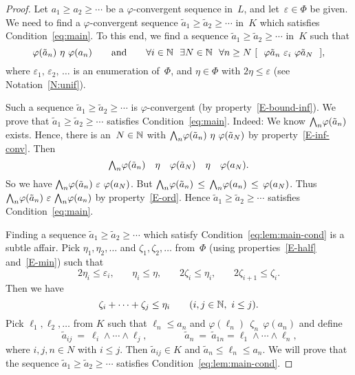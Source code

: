 \documentclass[main.tex]{subfiles}
\begin{document}
\begin{proof}
Let $a_1 \geq a_2 \geq \dotsb$ 
be a $\varphi$-convergent sequence in~$L$,
and let~$\varepsilon\in\Phi$ be given.
We need to find a $\varphi$-convergent sequence 
$\tilde a_1 \geq \tilde a_2 \geq \dotsb$ in~$K$
which satisfies Condition~\eqref{eq:main}.
To this end,
we find a sequence 
$\tilde a_1 \geq \tilde a_2 \geq \dotsb$ in~$K$
such that
\begin{equation}
\label{eq:lem:main-cond}
\varphi(\tilde a_n) \ \eta\ \varphi (a_n)
\qquad\text{and}\qquad
\forall i\in\N\ \ \exists N\in\N 
\ \ \forall n\geq N
\  [\ \  \varphi \tilde a_n \ \varepsilon_i\  \varphi \tilde a_N \ \ ],
\end{equation}
where $\varepsilon_1,\,\varepsilon_2,\,\dotsc$
is
an enumeration of~$\Phi$,
and $\eta\in\Phi$ with  $2\eta \leq \varepsilon$
(see Notation~\ref{N:unif}).

Such a sequence $\tilde a_1 \geq \tilde a_2 \geq \dotsb$
is $\varphi$-convergent 
(by property~\ref{E-bound-inf}).
We prove that $\tilde a_1 \geq \tilde a_2 \geq\dotsb$
satisfies Condition~\eqref{eq:main}. 
Indeed:
We know $\textstyle{\bigwedge}_n \varphi(\tilde a_n)$ exists.
Hence,
there is an~$N\in\mathbb{N}$
with 
 $\textstyle{\bigwedge}_n\varphi (\tilde a_n)\ \eta\ \varphi (\tilde a_N)$
by property~\ref{E-inf-conv}.
Then
\begin{equation*}
\textstyle{\bigwedge}_n \varphi (\tilde a_n) \quad \eta \quad \varphi(\tilde a_N)
\quad\eta\quad \varphi(a_N).
\end{equation*}
So we have 
$\bw_n \varphi (\tilde a_n) \ \ve\  \varphi(a_N)$.
But $\textstyle{\bigwedge}_n \varphi(\tilde a_n) \,\leq\,
\textstyle{\bigwedge}_n \varphi(a_n) \,\leq\,\varphi(a_N)$.
Thus 
$\bw_n \varphi(\tilde a_n) \ \ve\ 
\bw_n \varphi(a_n)$ by property~\ref{E-ord}.
Hence $\tilde a_1  \geq \tilde a_2 \geq \dotsb$
satisfies Condition~\eqref{eq:main}.

Finding a sequence $\tilde a_1 \geq \tilde a_2 \geq \dotsb$ 
which satisfy Condition~\eqref{eq:lem:main-cond}
is a subtle affair.
Pick $\eta_1, \eta_2,\dotsc$ and $\zeta_1,\zeta_2,\dotsc$
from~$\Phi$
(using properties~\ref{E-half}
and~\ref{E-min})
such that
\begin{equation*}
2 \eta_i \leq \varepsilon_i\text{,} \qquad
\eta_i \leq \eta\text{,} \qquad
2\zeta_i \leq \eta_i\text{,} \qquad
2\zeta_{i+1} \leq \zeta_{i}\text{.}
\end{equation*}
Then we have
\begin{equation}
\label{eq:lem:main-zeta--eta}
\zeta_i + \dotsb + \zeta_j \leq \eta_i \qquad (i,j\in\mathbb{N},\  i\leq j)\text{.}
\end{equation}
Pick $\ell_1,\ell_2,\dotsc$ from $K$ 
such that $\ell_n \leq a_n$ and $\varphi(\ell_n)\ \ \zeta_n\  \ \varphi(a_n)$
and define 
\begin{equation*}
\tilde{a}_{ij} \ =\ \ell_i \wedge \dotsb\wedge \ell_j\text{,}
\qquad\qquad
\tilde{a}_n \ =\ \tilde{a}_{1n} =\ell_1 \wedge\dotsb\wedge \ell_n\text{,}
\end{equation*}
where $i,j,n\in N$ with $i\leq j$.
Then $\tilde a_{ij} \in K$ and  $\tilde a_n \leq \ell_n \leq a_n$.
We will prove that
the sequence $\tilde a_1 \geq \tilde a_2 \geq \dotsb$
satisfies Condition~\eqref{eq:lem:main-cond}.


\end{proof}
\end{document}
